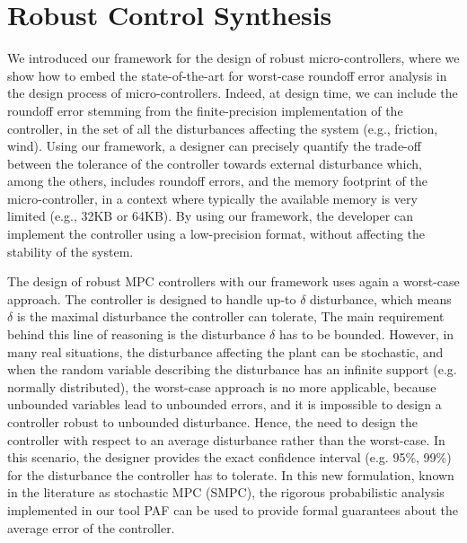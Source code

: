 \section{Robust Control Synthesis}
%
We introduced our framework for the design of robust micro-controllers, where we show how to embed the state-of-the-art for worst-case roundoff error analysis in the design process of micro-controllers.
%
Indeed, at design time, we can include the roundoff error stemming from the finite-precision implementation of the controller, in the set of all the disturbances affecting the system (e.g., friction, wind).
%
Using our framework, a designer can precisely quantify the trade-off between the tolerance of the controller towards external disturbance which, among the others, includes roundoff errors, and the memory footprint of the micro-controller, in a context where typically the available memory is very limited (e.g., 32KB or 64KB).
%
By using our framework, the developer can implement the controller using a low-precision format, without affecting the stability of the system.
%

The design of robust MPC controllers with our framework uses again a worst-case approach.
%
The controller is designed to handle up-to $\delta$ disturbance, which means $\delta$ is the maximal disturbance the controller can tolerate,
%
The main requirement behind this line of reasoning is the disturbance $\delta$ has to be bounded.
%
%
However, in many real situations, the disturbance affecting the plant can be stochastic, and when the random variable describing the disturbance has an infinite support (e.g. normally distributed), the worst-case approach is no more applicable, because unbounded variables lead to unbounded errors, and it is impossible to design a controller robust to unbounded disturbance.
%
Hence, the need to design the controller with respect to an average disturbance rather than the worst-case. In this scenario, the designer provides the exact confidence interval (e.g. 95\%, 99\%) for the disturbance the controller has to tolerate.
%
In this new formulation, known in the literature as stochastic MPC (SMPC), the rigorous probabilistic analysis implemented in our tool PAF can be used to provide formal guarantees about the average error of the controller.
%
%
%
